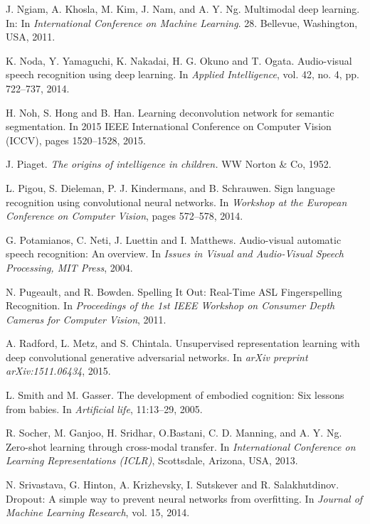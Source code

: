 \begin{thebibliography}{99}
{
  J. Ngiam, A. Khosla, M. Kim, J. Nam, and A. Y. Ng. 
  Multimodal deep learning. In:
  In \textit{International Conference on Machine Learning}.  28. 
  Bellevue, Washington, USA, 2011.

  K. Noda, Y. Yamaguchi, K. Nakadai, H. G. Okuno and T. Ogata. Audio-visual
  speech recognition using deep learning.  In \textit{Applied Intelligence},
  vol. 42, no. 4, pp. 722–737, 2014.

  H. Noh, S. Hong and  B. Han.  Learning deconvolution network for semantic
  segmentation. In 2015 IEEE International Conference on Computer Vision
  (ICCV), pages 1520--1528, 2015.

  J. Piaget. \textit{The origins of intelligence in children.}
  WW Norton \& Co, 1952.

  L. Pigou, S. Dieleman, P. J. Kindermans, and B. Schrauwen.
  Sign language recognition using convolutional neural networks. In
  \textit{Workshop at the European Conference on Computer Vision},
  pages 572--578, 2014.

  G. Potamianos, C. Neti, J. Luettin and  I. Matthews. Audio-visual
  automatic speech recognition: An overview. In \textit{Issues in Visual
  and Audio-Visual Speech Processing, MIT Press}, 2004.

  N. Pugeault, and R. Bowden. Spelling It Out: Real-Time ASL
  Fingerspelling Recognition. In \textit{Proceedings of the 1st IEEE
  Workshop on Consumer Depth Cameras for Computer Vision}, 2011.

  A. Radford, L. Metz, and S. Chintala. Unsupervised representation
  learning with deep convolutional generative adversarial networks. In 
  \textit{arXiv preprint arXiv:1511.06434}, 2015.

  L. Smith and M. Gasser. The development of embodied cognition:
  Six lessons from babies. In \textit{Artificial life}, 11:13--29, 2005.

  R. Socher, M. Ganjoo, H. Sridhar, O.Bastani, C. D. Manning, and
  A. Y. Ng. Zero-shot learning through cross-modal transfer.
  In \textit{International Conference on Learning Representations (ICLR)},
  Scottsdale, Arizona, USA, 2013.

  N. Srivastava, G. Hinton, A. Krizhevsky, I. Sutskever and R. Salakhutdinov.
  Dropout: A simple way to prevent neural networks from overfitting. In
  \textit{Journal of Machine Learning Research}, vol. 15, 2014.

}
\end{thebibliography}
